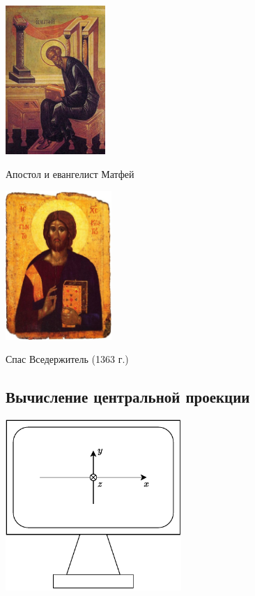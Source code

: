 \documentclass[10pt]{beamer}
\begin{document}
    {
    	{
    		\centering
    		\includegraphics[height=160pt]{4.jpg}
    		
    		Апостол и евангелист Матфей
    	}
    	{
    		\centering
    		\includegraphics[height=160pt]{scale_1200.jpg}
    		
    		Спас Вседержитель (1363 г.)
    	} 	
    }
    
    \subsection{Вычисление центральной проекции}
    
    {
    	\centering
    	\includegraphics[width=0.5\textwidth]{screen.pdf}
    }
    
\end{document}
